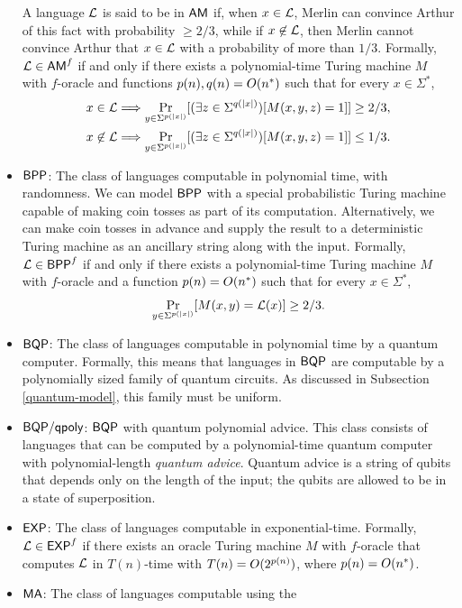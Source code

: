 \begin{itemize}
  A language $\mathcal{L}$ is said to be in $\mathsf{AM}$ if, when $x\in\mathcal{L}$, Merlin can
  convince Arthur of this fact with probability $\geq 2/3$, while if
  $x\not\in\mathcal{L}$, then Merlin cannot convince Arthur that $x\in\mathcal{L}$ with a
  probability of more than $1/3$. Formally, $\mathcal{L}\in\mathsf{AM}^f$ if and only if 
  there exists a polynomial-time Turing machine $M$ with $f$-oracle and 
  functions $p(n),q(n)=O(n^*)$ such that for every $x\in\Sigma^*$,
  \begin{align*}
    x\in\mathcal{L}&\Longrightarrow\Pr_{y\in\Sigma^{p(|x|)}}[(\exists
    z\in\Sigma^{q(|x|)})[M(x,y,z)=1]]\geq 2/3, \\
    x\not\in\mathcal{L}&\Longrightarrow\Pr_{y\in\Sigma^{p(|x|)}}[(\exists
    z\in\Sigma^{q(|x|)})[M(x,y,z)=1]]\leq 1/3.  
  \end{align*}
\item $\mathsf{BPP}$: The class of languages computable in polynomial time, with
  randomness. We can model $\mathsf{BPP}$ with a special probabilistic Turing
  machine capable of making coin tosses as part of its
  computation. Alternatively, we can make coin tosses in advance and supply the
  result to a deterministic Turing machine as an ancillary string along with
  the input. Formally, $\mathcal{L}\in\mathsf{BPP}^f$ if and only if there exists a
  polynomial-time Turing machine $M$ with $f$-oracle and a function
  $p(n)=O(n^*)$ such that for every $x\in\Sigma^*$,
  \[
  \Pr_{y\in\Sigma^{p(|x|)}}[M(x,y)=\mathcal{L}(x)]\geq 2/3.
  \]
\item $\mathsf{BQP}$: The class of languages computable in polynomial time by a
  quantum computer. Formally, this means that languages in $\mathsf{BQP}$ are
  computable by a polynomially sized family of quantum circuits. As discussed in 
  Subsection \ref{quantum-model}, this family must be uniform.
\item $\mathsf{BQP}/\mathsf{qpoly}$: $\mathsf{BQP}$ with quantum polynomial advice. This 
  class consists of languages that can be computed by a polynomial-time quantum 
  computer with polynomial-length \textit{quantum advice}. Quantum advice is a 
  string of qubits that depends only on the length of the input; the qubits are 
  allowed to be in a state of superposition.
\item $\mathsf{EXP}$: The class of languages computable in
  exponential-time. Formally, $\mathcal{L}\in\mathsf{EXP}^f$ if there exists an oracle
  Turing machine $M$ with $f$-oracle that computes $\mathcal{L}$ in $T(n)$-time with
  $T(n)=O(2^{p(n)})$, where $p(n)=O(n^*)$.
\item $\mathsf{MA}$: The class of languages computable using the

\end{itemize}
